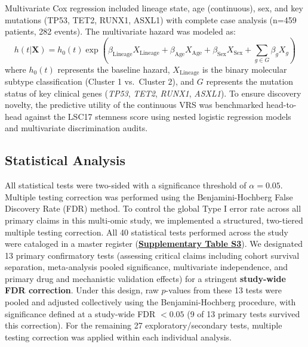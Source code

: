 \documentclass[11pt,a4paper]{article}
\begin{document}
Multivariate Cox regression included lineage state, age (continuous), sex, and key mutations (TP53, TET2, RUNX1, ASXL1) with complete case analysis (n=459 patients, 282 events). The multivariate hazard was modeled as:
\begin{equation}
h(t | \mathbf{X}) = h_0(t) \exp\left( \beta_{\text{Lineage}} X_{\text{Lineage}} + \beta_{\text{Age}} X_{\text{Age}} + \beta_{\text{Sex}} X_{\text{Sex}} + \sum_{g \in G} \beta_g X_g \right)
\end{equation}
where $h_0(t)$ represents the baseline hazard, $X_{\text{Lineage}}$ is the binary molecular subtype classification (Cluster 1 vs.\ Cluster 2), and $G$ represents the mutation status of key clinical genes (\textit{TP53}, \textit{TET2}, \textit{RUNX1}, \textit{ASXL1}). To ensure discovery novelty, the predictive utility of the continuous VRS was benchmarked head-to-head against the LSC17 stemness score \cite{ng2016lsc17} using nested logistic regression models and multivariate discrimination audits.

\subsection{Statistical Analysis}

All statistical tests were two-sided with a significance threshold of $\alpha = 0.05$. Multiple testing correction was performed using the Benjamini-Hochberg False Discovery Rate (FDR) method. To control the global Type I error rate across all primary claims in this multi-omic study, we implemented a structured, two-tiered multiple testing correction. All 40 statistical tests performed across the study were cataloged in a master register (\href{Supplementary_Methods.pdf#tab:tabS3}{\textbf{Supplementary Table S3}}). We designated 13 primary confirmatory tests (assessing critical claims including cohort survival separation, meta-analysis pooled significance, multivariate independence, and primary drug and mechanistic validation effects) for a stringent \textbf{study-wide FDR correction}. Under this design, raw $p$-values from these 13 tests were pooled and adjusted collectively using the Benjamini-Hochberg procedure, with significance defined at a study-wide FDR $< 0.05$ (9 of 13 primary tests survived this correction). For the remaining 27 exploratory/secondary tests, multiple testing correction was applied within each individual analysis.
\end{document}
